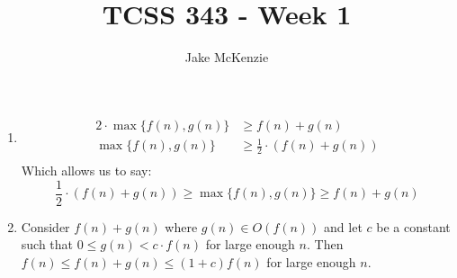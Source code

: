 \documentclass[12pt]{article}
\begin{document}
\title{TCSS 343 - Week 1}
\author{Jake McKenzie}
\maketitle
\begin{enumerate}
    \item
    \begin{align*}
        2 \cdot \max\{f(n),g(n)\} &\geq f(n) + g(n)\\
        \max\{f(n),g(n)\} &\geq \frac{1}{2} \cdot (f(n) + g(n))\\
    \end{align*}
    Which allows us to say:
    $$\frac{1}{2} \cdot (f(n) + g(n)) \geq \max\{f(n),g(n)\} \geq  f(n) + g(n)$$
    \item
    Consider $f(n) + g(n)$ where $g(n) \in O(f(n))$ and let $c$ be a constant such that $0 \leq g(n) < c \cdot f(n)$ for large enough $n$. Then $f(n) \leq f(n)+g(n) \leq (1 + c)f(n)$ for large enough $n$.
\end{enumerate}
\end{document}
